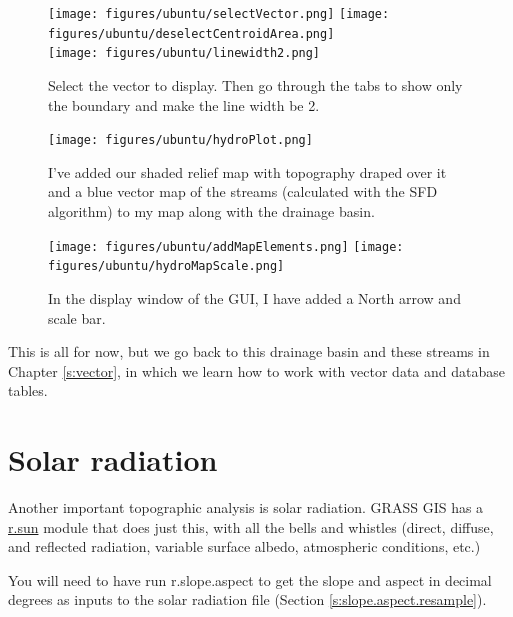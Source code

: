 \documentclass{book}
\begin{document}
\begin{figure}[!h]
 \begin{center}
 \texttt{[image: figures/ubuntu/selectVector.png]}
 \texttt{[image: figures/ubuntu/deselectCentroidArea.png]}\\
 \vspace{2mm}
 \texttt{[image: figures/ubuntu/linewidth2.png]}
 \caption{Select the vector to display. Then go through the tabs to show only the boundary and make the line width be 2.}
 \label{fig:dispVector}
 \end{center}
\end{figure}

\begin{figure}[!h]
 \begin{center}
 \texttt{[image: figures/ubuntu/hydroPlot.png]}
 \caption{I've added our shaded relief map with topography draped over it and a blue vector map of the streams (calculated with the SFD algorithm) to my map along with the drainage basin.}
 \label{fig:hydroPlot}
 \end{center}
\end{figure}

\begin{figure}[!htb]
 \begin{center}
 \texttt{[image: figures/ubuntu/addMapElements.png]}
 \texttt{[image: figures/ubuntu/hydroMapScale.png]}
 \caption{In the display window of the GUI, I have added a North arrow and scale bar.}
 \label{fig:hydroMap}
 \end{center}
\end{figure}

This is all for now, but we go back to this drainage basin and these streams in Chapter \ref{s:vector}, in which we learn how to work with vector data and database tables.

\afterpage{\clearpage}

\clearpage

\section{Solar radiation}
Another important topographic analysis is solar radiation. GRASS GIS has a \url{r.sun} module that does just this, with all the bells and whistles (direct, diffuse, and reflected radiation, variable surface albedo, atmospheric conditions, etc.)

You will need to have run r.slope.aspect to get the slope and aspect in decimal degrees as inputs to the solar radiation file (Section \ref{s:slope.aspect.resample}).
\end{document}
